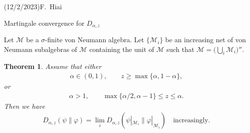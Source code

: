 \documentclass[11pt,reqno]{article}
\newtheorem{thm}{Theorem}[section]
\numberwithin{equation}{section}
\def\cM{\mathcal{M}}
\def\ffi{\varphi}
\begin{document}
\allowdisplaybreaks

\noindent (12/2/2023)\hfill F.\ Hiai

\medskip
\centerline{\Large Martingale convergence for $D_{\alpha,z}$}

\medskip
Let $\cM$ be a $\sigma$-finite von Neumann algebra. Let $\{\cM_i\}$ be an increasing net of von Neumann
subalgebras of $\cM$ containing the unit of $\cM$ such that $\cM=\bigl(\bigcup_i\cM_i\bigr)''$.

\begin{thm}\label{T-1}
Assume that either
\begin{align}\label{F-1}
\alpha\in(0,1),\qquad z\ge\max\{\alpha,1-\alpha\},
\end{align}
or
\begin{align}\label{F-2}
\alpha>1,\qquad\max\{\alpha/2,\alpha-1\}\le z\le\alpha.
\end{align}
Then we have
\begin{align}\label{F-3}
D_{\alpha,z}(\psi\|\ffi)=\lim_iD_{\alpha,z}(\psi|_{\cM_i}\|\ffi|_{\cM_i})
\quad\mbox{increasingly}.
\end{align}
\end{thm}
\end{document}
